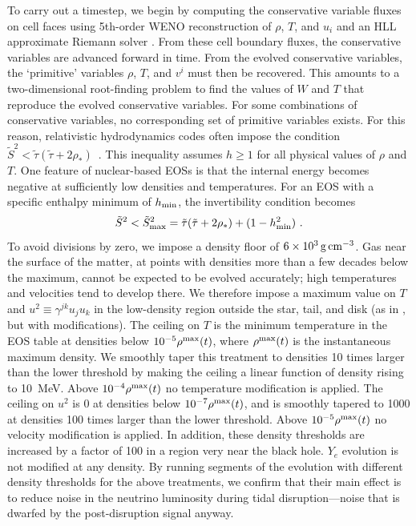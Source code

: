To carry out a timestep, we begin by computing the conservative variable
fluxes on cell faces using 5th-order WENO reconstruction \citep{liu1994-weno,
jian1996-efficient_weno} of $\rho$, $T$, and $u_i$ and an HLL approximate Riemann solver
\citep{hart1983-hll}.  From these
cell boundary fluxes, the conservative variables are advanced forward in time. 
From the evolved conservative variables, the `primitive' variables $\rho$,
$T$, and $v^i$ must then be recovered.  This amounts to a two-dimensional
root-finding problem to find the values of $W$ and $T$ that reproduce the
evolved conservative variables.  For some combinations of conservative
variables, no corresponding set of primitive variables exists.  For this
reason, relativistic
hydrodynamics codes often impose the condition 
$\tilde S^2 < \tilde\tau (\tilde\tau + 2\rho_*)$~\citep{etie2007-first_illinois_bhns}.
This inequality assumes $h\ge 1$ for all physical values of $\rho$ and $T$. 
One feature of nuclear-based EOSs is that the internal energy becomes
negative at sufficiently low densities and temperatures.  For an EOS
with a specific enthalpy minimum of $h_{\rm min}$, the invertibility condition
becomes
\begin{equation}
\tilde S^2 < \tilde S^2_{\rm max} = \tilde\tau (\tilde\tau + 2\rho_*)
+ (1-h^2_{\rm min})\ .
\end{equation}
To avoid divisions by zero, we impose a density floor of
$6 \times 10^3\rm\,g\,cm^{-3}$.
Gas near the surface of the matter, at points
with densities more than a few decades below the maximum, cannot
be expected to be evolved accurately; high temperatures and velocities tend
to develop there. We therefore impose a maximum value on
$T$ and $u^2 \equiv \gamma^{jk} u_j u_k$ in the low-density region outside the
star, tail, and disk (as in \citealt{fouc2013-compactness_and_spin}, but with modifications).
The ceiling on $T$ is the minimum temperature in the EOS table at densities below
$10^{-5}\rho^{\rm max}(t)$, where $\rho^{\rm max}(t)$ is the instantaneous maximum
density. We smoothly taper this treatment to densities 10 times larger than the lower
threshold by making the ceiling a linear function of density rising to 10~MeV.
Above $10^{-4}\rho^{\rm max}(t)$ no temperature modification is applied.
The ceiling on $u^2$ is 0 at densities below $10^{-7}\rho^{\rm max}(t)$,
and is smoothly tapered to 1000 at densities 100 times larger than the lower threshold.
Above $10^{-5}\rho^{\rm max}(t)$ no velocity modification is applied.
In addition, these density thresholds are increased by a factor of 100 in a region
very near the black hole. $Y_e$ evolution is not modified at any density.
By running segments of the evolution with different density
thresholds for the above treatments, we confirm that their main effect
is to reduce noise in the neutrino luminosity during tidal
disruption---noise that is dwarfed by the post-disruption signal anyway.

